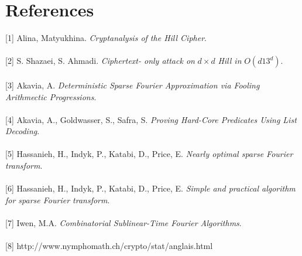 \documentclass{article}
\begin{document}
\section{References}

[1] Alina, Matyukhina. \textit{Cryptanalysis of the Hill Cipher}.\\
\\[0pt]
[2] S. Shazaei, S. Ahmadi. \textit{Ciphertext- only attack on} $d \times d$ \textit{Hill in} $O(d13^d)$.\\
\\[0pt]
[3] Akavia, A. \textit{Deterministic Sparse Fourier Approximation via Fooling Arithmectic Progressions}.\\
\\[0pt]
[4] Akavia, A., Goldwasser, S., Safra, S. \textit{Proving Hard-Core Predicates Using List Decoding}.\\
\\[0pt]
[5] Hassanieh, H., Indyk, P., Katabi, D., Price, E. \textit{Nearly optimal sparse Fourier transform}.\\
\\[0pt]
[6] Hassanieh, H., Indyk, P., Katabi, D., Price, E. \textit{Simple and practical algorithm for sparse Fourier transform}.\\
\\[0pt]
[7] Iwen, M.A. \textit{Combinatorial Sublinear-Time Fourier Algorithms}.\\
\\[0pt]
[8] http://www.nymphomath.ch/crypto/stat/anglais.html\\
\end{document}
